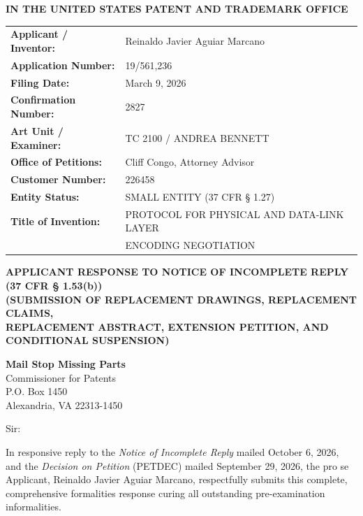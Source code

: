 \documentclass[11pt,letterpaper]{article}
\begin{document}
\thispagestyle{empty}

\begin{center}
    \textbf{\large IN THE UNITED STATES PATENT AND TRADEMARK OFFICE}
\end{center}

\vspace{0.3cm}
\noindent\begin{tabular}{p{2.3in}p{4.0in}}
\textbf{Applicant / Inventor:} & Reinaldo Javier Aguiar Marcano \\
\textbf{Application Number:} & 19/561,236 \\
\textbf{Filing Date:} & March 9, 2026 \\
\textbf{Confirmation Number:} & 2827 \\
\textbf{Art Unit / Examiner:} & TC 2100 / ANDREA BENNETT \\
\textbf{Office of Petitions:} & Cliff Congo, Attorney Advisor \\
\textbf{Customer Number:} & 226458 \\
\textbf{Entity Status:} & SMALL ENTITY (37 CFR \S{} 1.27) \\
\textbf{Title of Invention:} & PROTOCOL FOR PHYSICAL AND DATA-LINK LAYER \\
& ENCODING NEGOTIATION \\
\end{tabular}

\vspace{0.4cm}
\begin{center}
    \textbf{\large APPLICANT RESPONSE TO NOTICE OF INCOMPLETE REPLY \\
    (37 CFR \S{} 1.53(b))} \\
    \textbf{\normalsize (SUBMISSION OF REPLACEMENT DRAWINGS, REPLACEMENT CLAIMS, \\
    REPLACEMENT ABSTRACT, EXTENSION PETITION, AND CONDITIONAL SUSPENSION)}
\end{center}

\noindent\textbf{Mail Stop Missing Parts} \\
Commissioner for Patents \\
P.O. Box 1450 \\
Alexandria, VA 22313-1450

\vspace{0.2cm}
Sir:

In responsive reply to the \textit{Notice of Incomplete Reply} mailed October 6, 2026, and the \textit{Decision on Petition} (PETDEC) mailed September 29, 2026, the pro se Applicant, Reinaldo Javier Aguiar Marcano, respectfully submits this complete, comprehensive formalities response curing all outstanding pre-examination informalities.
\end{document}
